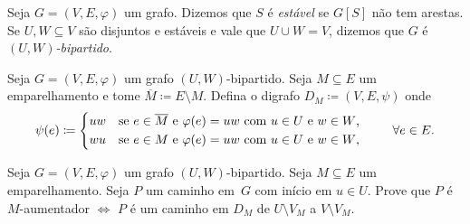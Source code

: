 \documentclass[10pt,reqno]{amsart}
\begin{document}
Seja \(G = (V,E,\varphi)\) um grafo.  Dizemos que \(S\) é
\emph{estável} se \(G[S]\) não tem arestas.  Se \(U,W \subseteq V\)
são disjuntos e estáveis e vale que \(U \cup W = V\), dizemos que
\(G\) é \emph{\((U,W)\)-bipartido}.

Seja \(G = (V,E,\varphi)\) um grafo \((U,W)\)-bipartido.  Seja
\(M \subseteq E\) um emparelhamento e tome
\(\overline{M} \coloneqq E \setminus M\).  Defina o digrafo
\(D_M \coloneqq (V,E,\psi)\) onde
\begin{equation*}
  \psi(e)
  \coloneqq
  \begin{cases*}
    uw
    &
    se \(e \in \overline{M}\) e \(\varphi(e) = uw\) com \(u \in U\) e \(w \in W\),
    \\
    wu
    &
    se \(e \in M\) e \(\varphi(e) = uw\)  com \(u \in U\) e \(w \in W\),
  \end{cases*}
  \qquad
  \forall e \in E.
\end{equation*}

\begin{exercise}
  Seja \(G = (V,E,\varphi)\) um grafo \((U,W)\)-bipartido.  Seja
  \(M \subseteq E\) um emparelhamento.  Seja \(P\) um caminho em~\(G\)
  com início em \(u \in U\).  Prove que \(P\) é \(M\)-aumentador
  \(\iff\) \(P\) é um caminho em \(D_M\) de \(U \setminus V_M\) a
  \(V \setminus V_M\).
\end{exercise}


\end{document}
